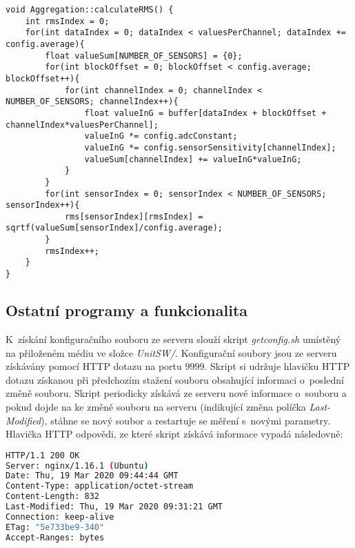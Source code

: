 \begin{lstlisting}[style=c++, caption={Výpočet kvadratického průměru z~bloku dat několika senzorů.}, label={code:rms}]
void Aggregation::calculateRMS() {
    int rmsIndex = 0;
    for(int dataIndex = 0; dataIndex < valuesPerChannel; dataIndex += config.average){
        float valueSum[NUMBER_OF_SENSORS] = {0};
        for(int blockOffset = 0; blockOffset < config.average; blockOffset++){
            for(int channelIndex = 0; channelIndex < NUMBER_OF_SENSORS; channelIndex++){
                float valueInG = buffer[dataIndex + blockOffset + channelIndex*valuesPerChannel];
                valueInG *= config.adcConstant;
                valueInG *= config.sensorSensitivity[channelIndex];
                valueSum[channelIndex] += valueInG*valueInG;
            }
        }
        for(int sensorIndex = 0; sensorIndex < NUMBER_OF_SENSORS; sensorIndex++){
            rms[sensorIndex][rmsIndex] = sqrtf(valueSum[sensorIndex]/config.average);
        }
        rmsIndex++;
    }
}
\end{lstlisting}

\subsection{Ostatní programy a funkcionalita}
K~získání konfiguračního souboru ze serveru slouží skript \textit{getconfig.sh} umístěný na přiloženém médiu ve složce \textit{UnitSW/}. Konfigurační soubory jsou ze serveru získávány pomocí HTTP dotazu na portu $9999$. Skript si udržuje hlavičku HTTP dotazu získanou při předchozím stažení souboru obsahující informaci o~poslední změně souboru. Skript periodicky získává ze serveru nové informace o~souboru a pokud dojde na ke změně souboru na serveru (indikující změna políčka \textit{Last-Modified}), stáhne se nový soubor a restartuje se měření s~novými parametry. Hlavička HTTP odpovědi, ze které skript získává informace vypadá následovně:
\begin{lstlisting}[language=bash, breaklines]
HTTP/1.1 200 OK
Server: nginx/1.16.1 (Ubuntu)
Date: Thu, 19 Mar 2020 09:44:44 GMT
Content-Type: application/octet-stream
Content-Length: 832
Last-Modified: Thu, 19 Mar 2020 09:31:21 GMT
Connection: keep-alive
ETag: "5e733be9-340"
Accept-Ranges: bytes
\end{lstlisting}
